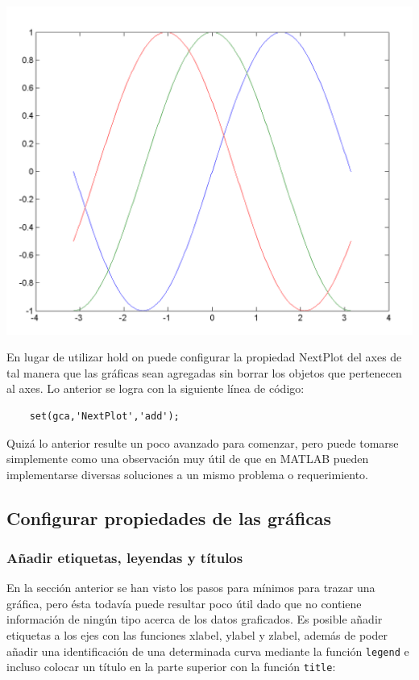\begin{center}
\includegraphics[scale=0.6]{src/ch4/img_4_3.png}
\end{center}

En lugar de utilizar hold on puede configurar la propiedad NextPlot del axes de tal manera 
que las gráficas sean agregadas sin borrar los objetos que pertenecen al axes. Lo anterior 
se logra con la siguiente línea de código:

\begin{verbatim}
	set(gca,'NextPlot','add');
\end{verbatim}

Quizá lo anterior resulte un poco avanzado para comenzar, pero puede tomarse simplemente 
como una observación muy útil de que en MATLAB pueden implementarse diversas soluciones a 
un mismo problema o requerimiento.

\subsection{Configurar propiedades de las gráficas}

\subsubsection{Añadir etiquetas, leyendas y títulos}

En la sección anterior se han visto los pasos para mínimos para trazar una gráfica, pero 
ésta todavía puede resultar poco útil dado que no contiene información de ningún tipo 
acerca de los datos graficados. Es posible añadir etiquetas a los ejes con las funciones 
xlabel, ylabel y zlabel, además de poder añadir una identificación de una determinada 
curva mediante la función \texttt{legend} e incluso colocar un título en la parte superior con la 
función \texttt{title}:

